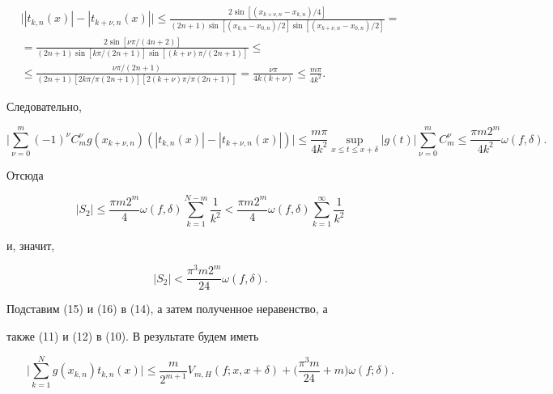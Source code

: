 \begin{multline*}


\big||t_{k,n}(x)|-|t_{k+\nu,n}(x)|\big|\le\frac{2\sin[(x_


{k+\nu,n}-x_{k,n})/4]}{(2n+1)\sin[(x_{k,n}-x_{0,n})/2]


\sin[(x_{k+\nu,n}-x_{0,n})/2]}=\\


%


=\frac{2\sin[\nu\pi/(4n+2)]}{(2n+1)\sin[k\pi/(2n+1)]


\sin[(k+\nu)\pi/(2n+1)]}\le\\


%


\le\frac{\nu\pi/(2n+1)}{(2n+1)[2k\pi/\pi(2n+1)][2(k+\nu)


\pi/\pi(2n+1)]}=\frac{\nu\pi}{4k(k+\nu)}\le\frac{m\pi}{4k^2}.


\end{multline*}


Следовательно,


$$


\bigg|\sum_{\nu=0}^m(-1)^{\nu}C_m^{\nu}g(x_{k+\nu,n})


(|t_{k,n}(x)|-|t_{k+\nu,n}(x)|)\bigg|\le


\frac{m\pi}{4k^2}\sup_{x\le t\le x+\delta}|g(t)|


\sum_{\nu=0}^mC_m^{\nu}\le\frac{\pi m2^m}{4k^2}\omega(f,\delta).


$$


Отсюда


$$


|S_2|\le\frac{\pi m2^m}4\omega(f,\delta)\sum_{k=1}^{N-m}


\frac1{k^2}<\frac{\pi m2^m}4\omega(f,\delta)\sum_{k=1}^


{\infty}\frac1{k^2}


$$


и, значит,


\begin{equation}


|S_2|<\frac{\pi^3m2^m}{24}\omega(f,\delta).


\end{equation}





Подставим (15) и (16) в (14), а затем полученное неравенство, а


также (11) и (12) в (10). В результате будем иметь


\begin{equation}


\bigg|\sum_{k=1}^Ng(x_{k,n})t_{k,n}(x)\bigg|\le\frac m{2^{m+1}}


V_{m,H}(f;x,x+\delta)+\bigg(\frac{\pi^3m}{24}+m\bigg)\omega


(f;\delta).


\end{equation}





